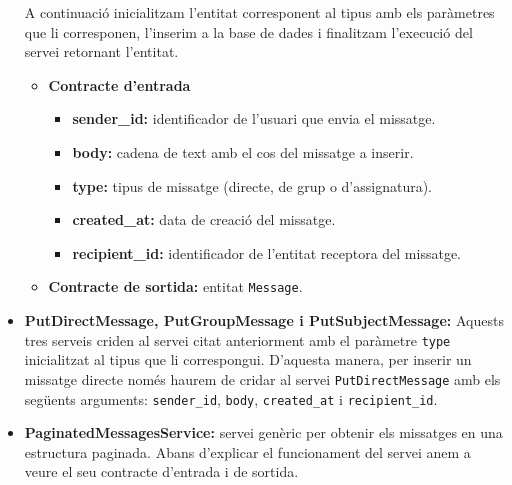 \begin{itemize}
			A continuació inicialitzam l'entitat corresponent al tipus amb els paràmetres que li corresponen, l'inserim a la base de dades i finalitzam l'execució del servei retornant l'entitat.
			
				\begin{itemize}
					\item \textbf{Contracte d'entrada}
						\begin{itemize}
							\item \textbf{sender\_id:} identificador de l'usuari que envia el missatge.
							\item \textbf{body:} cadena de text amb el cos del missatge a inserir.
							\item \textbf{type:} tipus de missatge (directe, de grup o d'assignatura).
							\item \textbf{created\_at:} data de creació del missatge.
							\item \textbf{recipient\_id:} identificador de l'entitat receptora del missatge.
						\end{itemize}
					\item \textbf{Contracte de sortida:} entitat \texttt{Message}.
			\end{itemize}
			
			
			
			\item \textbf{PutDirectMessage, PutGroupMessage i PutSubjectMessage:} Aquests tres serveis criden al servei citat anteriorment amb el paràmetre \texttt{type} inicialitzat al tipus que li correspongui. D'aquesta manera, per inserir un missatge directe només haurem de cridar al servei \texttt{PutDirectMessage} amb els següents arguments: \texttt{sender\_id}, \texttt{body}, \texttt{created\_at} i \texttt{recipient\_id}.
				
			\item \textbf{PaginatedMessagesService:} servei genèric per obtenir els missatges en una estructura paginada.  Abans d'explicar el funcionament del servei anem a veure el seu contracte d'entrada i de sortida.
			

\end{itemize}
